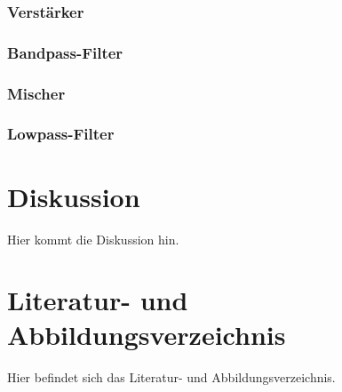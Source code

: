 \documentclass[11pt]{article}
\begin{document}
\subsubsection{Verstärker}
\subsubsection{Bandpass-Filter}
\subsubsection{Mischer}
\subsubsection{Lowpass-Filter}
\section{Diskussion}
Hier kommt die Diskussion hin.
\section{Literatur- und Abbildungsverzeichnis}
Hier befindet sich das Literatur- und Abbildungsverzeichnis.
\end{document}
